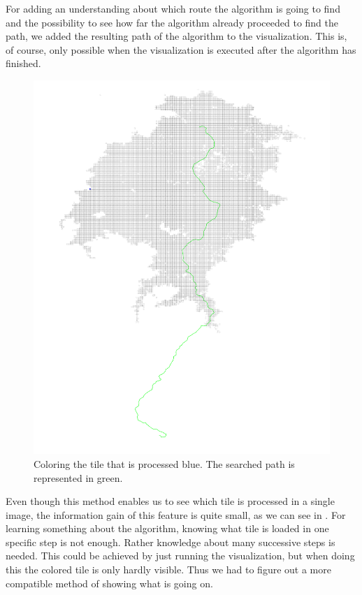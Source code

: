 \documentclass
[
    paper = a4,
    pagesize,
    12 pt,
    oneside,                       %
    open = right,
    DIV = calc,
    BCOR = 0 mm,                   %
    bibtotoc
]
{scrbook}
\begin{document}
For adding an understanding about which route the algorithm is going to find and the possibility to see how far the algorithm already proceeded to find the path, we added the resulting path of the algorithm to the visualization.
This is, of course, only possible when the visualization is executed after the algorithm has finished.

\begin{figure}
        \includegraphics[width=\textwidth]{Images/vis-current-tile.png}
\caption[]{Coloring the tile that is processed blue. The searched path is represented in green.}
\label{fig:color_current_tile}
\end{figure}

Even though this method enables us to see which tile is processed in a single image, the information gain of this feature is quite small, as we can see in .
For learning something about the algorithm, knowing what tile is loaded in one specific step is not enough.
Rather knowledge about many successive steps is needed.
This could be achieved by just running the visualization, but when doing this the colored tile is only hardly visible.
Thus we had to figure out a more compatible method of showing what is going on.
\end{document}
